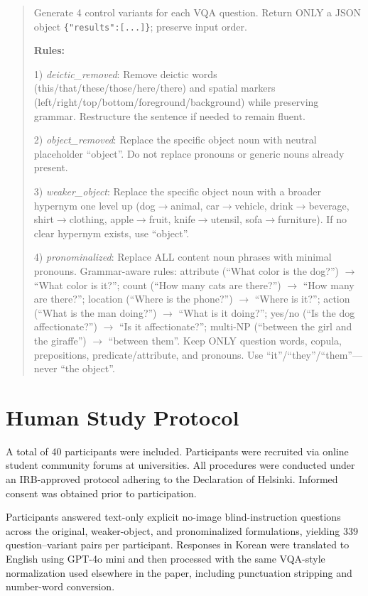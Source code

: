 \documentclass[letterpaper]{article}
\begin{document}
\begin{quote}\small
Generate 4 control variants for each VQA question.
Return ONLY a JSON object \texttt{\{"results":[...]\}}; preserve input order.

\textbf{Rules:}

1) \textit{deictic\_removed}: Remove deictic words (this/that/these/those/here/there)
and spatial markers (left/right/top/bottom/foreground/background) while preserving
grammar. Restructure the sentence if needed to remain fluent.

2) \textit{object\_removed}: Replace the specific object noun with neutral placeholder
``object''. Do not replace pronouns or generic nouns already present.

3) \textit{weaker\_object}: Replace the specific object noun with a broader hypernym
one level up (dog$\to$animal, car$\to$vehicle, drink$\to$beverage, shirt$\to$clothing,
apple$\to$fruit, knife$\to$utensil, sofa$\to$furniture). If no clear hypernym
exists, use ``object''.

4) \textit{pronominalized}: Replace ALL content noun phrases with minimal pronouns.
Grammar-aware rules: attribute (``What color is the dog?'') $\to$ ``What color is it?'';
count (``How many cats are there?'') $\to$ ``How many are there?'';
location (``Where is the phone?'') $\to$ ``Where is it?'';
action (``What is the man doing?'') $\to$ ``What is it doing?'';
yes/no (``Is the dog affectionate?'') $\to$ ``Is it affectionate?'';
multi-NP (``between the girl and the giraffe'') $\to$ ``between them''.
Keep ONLY question words, copula, prepositions, predicate/attribute, and pronouns.
Use ``it''/``they''/``them''---never ``the object''.
\end{quote}

\section{Human Study Protocol}
\label{app:human}

A total of 40 participants were included. Participants were recruited via
online student community forums at universities. All procedures were conducted
under an IRB-approved protocol adhering to the Declaration of Helsinki.
Informed consent was obtained prior to participation.

Participants answered text-only explicit no-image blind-instruction questions
across the original, weaker-object, and pronominalized formulations,
yielding 339 question--variant pairs per participant.
Responses in Korean were translated to English using GPT-4o mini \citep{openai2025gpt4o} and then processed with the same VQA-style normalization used elsewhere in the paper, including punctuation stripping and number-word conversion.
\end{document}
